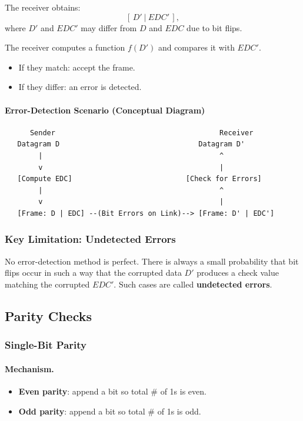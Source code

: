 \documentclass[12pt]{article}
\begin{document}
The receiver obtains:
\[
    [\, D' \ | \ EDC' \,],
\]
where $D'$ and $EDC'$ may differ from $D$ and $EDC$ due to bit flips.

The receiver computes a function $f(D')$ and compares it with $EDC'$.

\begin{itemize}
    \item If they match: accept the frame.
    \item If they differ: an error is detected.
\end{itemize}

\paragraph{Error-Detection Scenario (Conceptual Diagram)}

\begin{verbatim}
      Sender                                       Receiver
   Datagram D                                 Datagram D'
        |                                          ^
        v                                          |
   [Compute EDC]                           [Check for Errors]
        |                                          ^
        v                                          |
   [Frame: D | EDC] --(Bit Errors on Link)--> [Frame: D' | EDC']
\end{verbatim}

\subsubsection{Key Limitation: Undetected Errors}

No error-detection method is perfect. There is always a small probability that
bit flips occur in such a way that the corrupted data $D'$ produces a check value
matching the corrupted $EDC'$. Such cases are called \textbf{undetected errors}.

\subsection{Parity Checks}

\subsubsection{Single-Bit Parity}

\paragraph{Mechanism.}
\begin{itemize}
    \item \textbf{Even parity}: append a bit so total \# of 1s is even.
    \item \textbf{Odd parity}: append a bit so total \# of 1s is odd.
\end{itemize}
\end{document}
